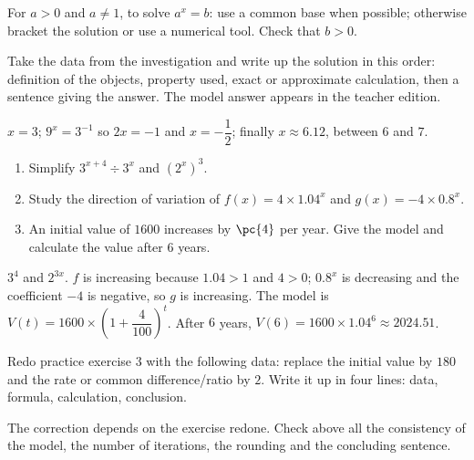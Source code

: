 \begin{summary}For $a>0$ and $a\neq1$, to solve $a^x=b$: use a common base when possible; otherwise bracket the solution or use a numerical tool. Check that $b>0$.\end{summary}

\begin{example}
Take the data from the investigation and write up the solution in this order: definition of the objects, property used, exact or approximate calculation, then a sentence giving the answer. The model answer appears in the teacher edition.
\end{example}
\begin{solution}$x=3$; $9^x=3^{-1}$ so $2x=-1$ and $x=-\dfrac12$; finally $x\approx\num{6,12}$, between $6$ and $7$.\end{solution}

\begin{exercise}[essential]
\begin{enumerate}\item Simplify $3^{x+4}\div3^x$ and $(2^x)^3$.\item Study the direction of variation of $f(x)=4\times\num{1,04}^x$ and $g(x)=-4\times\num{0,8}^x$.\item An initial value of $1600$ increases by $\pc{4}$ per year. Give the model and calculate the value after $6$ years.\end{enumerate}
\end{exercise}
\begin{solution}$3^4$ and $2^{3x}$. $f$ is increasing because $\num{1,04}>1$ and $4>0$; $\num{0,8}^x$ is decreasing and the coefficient $-4$ is negative, so $g$ is increasing. The model is $V(t)=1600\times\left(1+\dfrac{4}{100}\right)^t$. After $6$ years, $V(6)=1600\times\num{1,04}^6\approx\num{2024,51}$.\end{solution}


\begin{homework}Redo practice exercise 3 with the following data: replace the initial value by $180$ and the rate or common difference/ratio by $2$. Write it up in four lines: data, formula, calculation, conclusion.\end{homework}
\begin{solution}The correction depends on the exercise redone. Check above all the consistency of the model, the number of iterations, the rounding and the concluding sentence.\end{solution}

